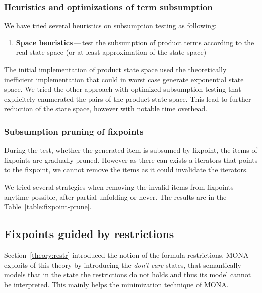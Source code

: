     \subsubsection{Heuristics and optimizations of term subsumption}
      
	We have tried several heuristics on subsumption testing as
	following:
	\begin{enumerate}
	  \item \textbf{Space heuristics}\,---\,test the subsumption of
	  product terms according to the real state space (or at least
	  approximation of the state space)
	\end{enumerate}
	
	The initial implementation of product state space used the 
	theoretically inefficient implementation that could in worst
	case generate exponential state space. We tried the other
	approach with optimized subsumption testing that explicitely
	enumerated the pairs of the product state space. This lead to
	further reduction of the state space, however with notable 
	time overhead.
    
    \subsubsection{Subsumption pruning of fixpoints}
  
    During the test, whether the generated item is subsumed by
    fixpoint, the items of fixpoints are gradually pruned. However
    as there can exists a iterators that points to the fixpoint,
    we cannot remove the items as it could invalidate the iterators.
    
	We tried several strategies when removing the invalid items from
	fixpoints\,---\,anytime possible, after partial unfolding or 
	never. The results are in the Table~\ref{table:fixpoint-prune}.    
    
  
  \subsection{Fixpoints guided by restrictions}\label{opt:fixpoint-guides}
  
  Section~\ref{theory:restr} introduced the notion of the formula
  restrictions. MONA exploits of this theory by introducing the
  \emph{don't care} states, that semantically models that in the
  state the restrictions do not holds and thus its model cannot
  be interpreted. This mainly helps the minimization technique
  of MONA.
  

